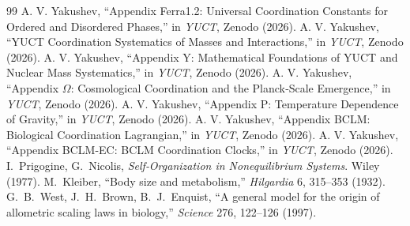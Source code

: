 \documentclass[11pt,a4paper]{article}
\begin{document}
\begin{thebibliography}{99}
		 A. V. Yakushev, ``Appendix Ferra1.2: Universal Coordination Constants for Ordered and Disordered Phases,'' in \emph{YUCT}, Zenodo (2026).
		 A. V. Yakushev, ``YUCT Coordination Systematics of Masses and Interactions,'' in \emph{YUCT}, Zenodo (2026).
		 A. V. Yakushev, ``Appendix Y: Mathematical Foundations of YUCT and Nuclear Mass Systematics,'' in \emph{YUCT}, Zenodo (2026).
		 A. V. Yakushev, ``Appendix $\Omega$: Cosmological Coordination and the Planck‑Scale Emergence,'' in \emph{YUCT}, Zenodo (2026).
		 A. V. Yakushev, ``Appendix P: Temperature Dependence of Gravity,'' in \emph{YUCT}, Zenodo (2026).
		 A. V. Yakushev, ``Appendix BCLM: Biological Coordination Lagrangian,'' in \emph{YUCT}, Zenodo (2026).
		 A. V. Yakushev, ``Appendix BCLM-EC: BCLM Coordination Clocks,'' in \emph{YUCT}, Zenodo (2026).
		 I.~Prigogine, G.~Nicolis, \emph{Self‑Organization in Nonequilibrium Systems}. Wiley (1977).
		 M.~Kleiber, ``Body size and metabolism,'' \emph{Hilgardia} 6, 315–353 (1932).
		 G.~B.~West, J.~H.~Brown, B.~J.~Enquist, ``A general model for the origin of allometric scaling laws in biology,'' \emph{Science} 276, 122–126 (1997).
	\end{thebibliography}
	
\end{document}
